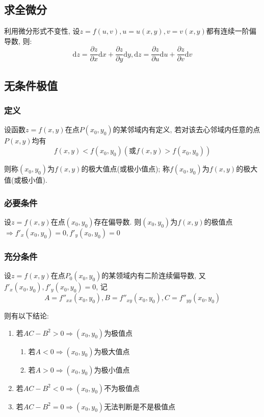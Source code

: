 \subsection{求全微分}
利用微分形式不变性, 设$ z=f(u,v), u=u(x,y), v=v(x,y) $都有连续一阶偏导数, 则:
\begin{equation*}
    \mathrm{d}z=\frac{\partial z}{\partial x}\mathrm{d}x+\frac{\partial z}{\partial y}\mathrm{d}y, \mathrm{d}z=\frac{\partial z}{\partial u}\mathrm{d}u+\frac{\partial z}{\partial v}\mathrm{d}v
\end{equation*}
\subsection{无条件极值}
\subsubsection{定义}
设函数$ z=f(x,y) $在点$ P(x_{0},y_{0}) $的某邻域内有定义, 若对该去心邻域内任意的点$ P(x,y) $均有
\begin{equation*}
    f(x,y)<f(x_{0},y_{0})(\text{或}f(x,y)>f(x_{0},y_{0}))
\end{equation*}\par
则称$ (x_{0},y_{0}) $为$ f(x,y) $的极大值点(或极小值点); 称$ f(x_{0},y_{0}) $为$ f(x,y) $的极大值(或极小值).
\subsubsection{必要条件}
设$ z=f(x,y) $在点$ (x_{0},y_{0}) $存在偏导数. 则$ (x_{0},y_{0}) $为$ f(x,y) $的极值点$ \Rightarrow f'_{x}(x_{0},y_{0})=0, f'_{y}(x_{0},y_{0})=0 $
\subsubsection{充分条件}
设$ z=f(x,y) $在点$ P_{0}(x_{0},y_{0}) $的某领域内有二阶连续偏导数, 又$ f'_{x}(x_{0},y_{0}),f'_{y}(x_{0},y_{0})=0 $, 记
\begin{equation*}
    A=f''_{xx}(x_{0},y_{0}), B=f''_{xy}(x_{0},y_{0}), C=f''_{yy}(x_{0},y_{0})
\end{equation*}\par
则有以下结论:
\begin{enumerate}
    \item 若$ AC-B^{2}>0\Rightarrow (x_{0},y_{0}) $为极值点
          \begin{enumerate}
              \item 若$ A<0\Rightarrow (x_{0},y_{0}) $为极大值点
              \item 若$ A>0\Rightarrow (x_{0},y_{0}) $为极小值点
          \end{enumerate}
    \item 若$ AC-B^{2}<0\Rightarrow (x_{0},y_{0}) $不为极值点
    \item 若$ AC-B^{2}=0\Rightarrow (x_{0},y_{0}) $无法判断是不是极值点
\end{enumerate}
